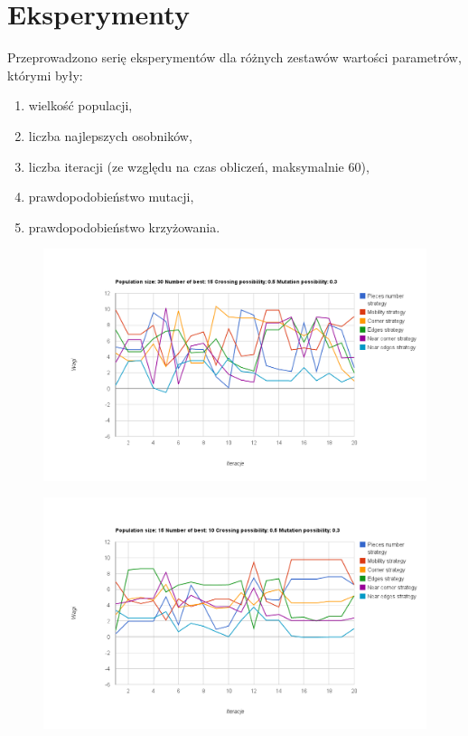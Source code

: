  \section{Eksperymenty}
 
 Przeprowadzono serię eksperymentów dla różnych zestawów wartości parametrów, którymi były:
 \begin{enumerate}
  \item wielkość populacji,
  \item liczba najlepszych osobników,
  \item liczba iteracji (ze względu na czas obliczeń, maksymalnie 60),
  \item prawdopodobieństwo mutacji,
  \item prawdopodobieństwo krzyżowania.
 \end{enumerate}
 
\begin{figure}[h!]
\centering
\includegraphics[width=\textwidth]{img/chart1.png}
\end{figure}

\begin{figure}[h!]
\centering
\includegraphics[width=\textwidth]{img/chart2.png}
\end{figure}

